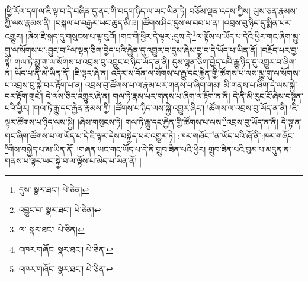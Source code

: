 །ཕྱི་རོལ་དག་ལ་ཇི་ལྟ་བ་དེ་བཞིན་དུ་ནང་གི་བདག་ཉིད་ལ་ཡང་ཡིན་ཏེ། བཅོམ་ལྡན་འདས་ཀྱིས། ལུས་ཅན་རྣམས་ཀྱི་ལས་རྣམས་ནི། །བསྐལ་པ་བརྒྱར་ཡང་ཆུད་མི་ཟ། །ཚོགས་ཤིང་དུས་ལ་བབ་པ་ན། །འབྲས་བུ་ཉིད་དུ་སྨིན་པར་འགྱུར། །ཞེས་ཇི་སྐད་དུ་གསུངས་པ་ལྟ་བུའོ། །གང་གི་ཕྱིར་དེ་ལྟར་:དུས་དེ་\footnote{དུས་  སྣར་ཐང་།  པེ་ཅིན། }ལ་ལྟོས་པ་ཡོད་པ་དེའི་ཕྱིར་གང་ཞིག་མྱུ་གུ་ལ་སོགས་པ་:བྱུང་བ་\footnote{འབྱུང་བ་  སྣར་ཐང་།  པེ་ཅིན། }ལ་ལྷན་ཅིག་བྱེད་པའི་རྐྱེན་དུ་འགྱུར་བ་དུས་ཞེས་བྱ་བ་དེ་ཡོད་པ་ཡིན་ནོ། །བརྗོད་པར་བྱ་སྟེ། གལ་ཏེ་མྱུ་གུ་ལ་སོགས་པ་འབྲས་བུ་འབྱུང་བ་ཉིད་ཡོད་ན་ནི། དུས་ལྷན་ཅིག་བྱེད་པའི་རྒྱུ་ཉིད་དུ་འགྱུར་བ་ཞིག་ན། ཡོད་པ་ནི་མ་ཡིན་ནོ། །ཇི་ལྟར་ཞེ་ན། འདིར་ས་བོན་ལ་སོགས་པ་རྒྱུ་དང་རྐྱེན་གྱི་ཚོགས་པ་ལས་མྱུ་གུ་ལ་སོགས་པ་འབྲས་བུ་སྐྱེ་བར་རྟོག་པ་ན། འབྲས་བུ་ཚོགས་པ་ལ་རྣམ་པར་གནས་པ་ཞིག་གམ། མི་གནས་པ་ཞིག་དེ་ལས་སྐྱེ་བར་རྟོག་གྲང་། དེ་ལས་ཅིར་འགྱུར་ཞེ་ན། གལ་ཏེ་རྣམ་པར་གནས་པ་ཞིག་ལ་རྟོག་ན་ནི། དེ་ནི་མི་རུང་ངོ་ཞེས་བསྟན་པའི་ཕྱིར། །གལ་ཏེ་རྒྱུ་དང་རྐྱེན་རྣམས་ཀྱི། །ཚོགས་པ་ཉིད་ལས་སྐྱེ་འགྱུར་ཞིང་། །ཚོགས་ལ་འབྲས་བུ་ཡོད་ན་ནི། །ཇི་ལྟར་ཚོགས་པ་ཉིད་ལས་སྐྱེ། །ཞེས་གསུངས་ཏེ། གལ་ཏེ་རྒྱུ་དང་རྐྱེན་གྱི་ཚོགས་པ་ལས་\footnote{ལ་  སྣར་ཐང་།  པེ་ཅིན། }འབྲས་བུ་ཡོད་ན་ནི། དེ་ལྟ་ན་གང་ཞིག་ཚོགས་པ་ལ་ཡོད་པ་དེ་ཇི་ལྟར་དེས་བསྐྱེད་པར་འགྱུར་ཏེ། :ཁར་གཞོང་\footnote{འཁར་གཞོང་  སྣར་ཐང་།  པེ་ཅིན། }ན་ཡོད་པའི་ཞོ་ནི་:ཁར་གཞོང་\footnote{འཁར་གཞོང་  སྣར་ཐང་།  པེ་ཅིན། }གིས་བསྐྱེད་པ་མ་ཡིན་ནོ། །གཞན་ཡང་གང་ཡོད་པ་དེ་ནི་གྲུབ་ཟིན་པའི་ཕྱིར། གྲུབ་ཟིན་པའི་བུམ་པ་མདུན་ན་གནས་པ་ལྟར་ཡང་སྐྱེ་བ་ལ་ལྟོས་པ་མེད་པ་ཡིན་ནོ། །
